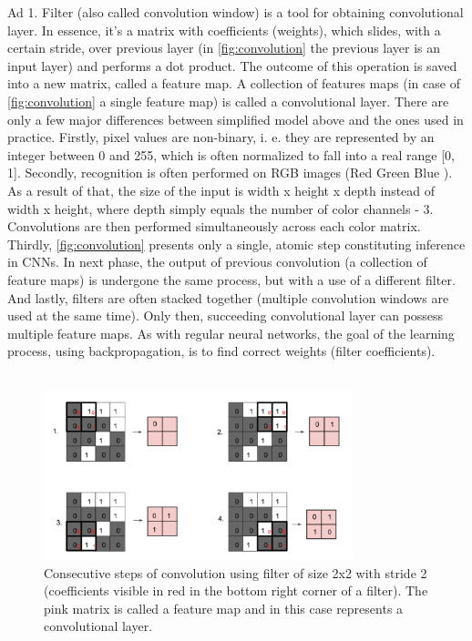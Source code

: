 \documentclass[11pt]{article}
\begin{document}
Ad 1. Filter (also called convolution window) is a tool for obtaining convolutional layer. In essence, it's a matrix with coefficients (weights), which slides, with a certain stride, over previous layer (in \autoref{fig:convolution} the previous layer is an input layer) and performs a dot product. The outcome of this operation is saved into a new matrix, called a feature map. A collection of features maps (in case of \autoref{fig:convolution} a single feature map) is called a convolutional layer. There are only a few major differences between simplified model above and the ones used in practice. Firstly, pixel values are non-binary, i. e. they are represented by an integer between 0 and 255, which is often normalized to fall into a real range [0, 1]. Secondly, recognition is often performed on RGB images (Red Green Blue \cite{rgb_def}). As a result of that, the size of the input is width x height x depth instead of width x height, where depth simply equals the number of color channels - 3. Convolutions are then performed simultaneously across each color matrix. Thirdly, \autoref{fig:convolution} presents only a single, atomic step constituting inference in CNNs. In next phase, the output of previous convolution (a collection of feature maps) is undergone the same process, but with a use of a different filter. And lastly, filters are often stacked together (multiple convolution windows are used at the same time). Only then, succeeding convolutional layer can possess multiple feature maps. As with regular neural networks, the goal of the learning process, using backpropagation, is to find correct weights (filter coefficients).\\\\

\begin{figure}[h]
\includegraphics[width=0.8\textwidth]{convolution}
\centering
\caption{Consecutive steps of convolution using filter of size 2x2 with stride 2 (coefficients visible in red in the bottom right corner of a filter). The pink matrix is called a feature map and in this case represents a convolutional layer.}
\label{fig:convolution}
\end{figure}
\end{document}
